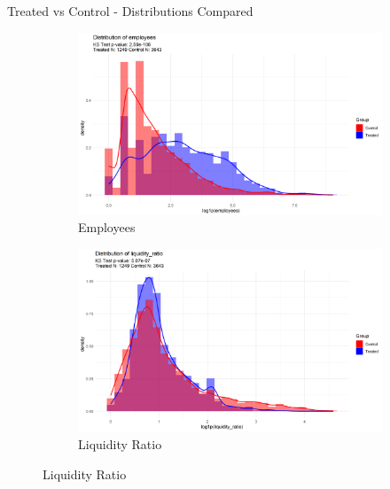 \documentclass{beamer}
\begin{document}
\begin{frame}{Treated vs Control - Distributions Compared}
\begin{figure}[ht]
\begin{subfigure}[b]{0.45\textwidth}
            \end{subfigure}
            \hfill
            \begin{subfigure}[b]{0.45\textwidth}
                \centering
                \includegraphics[width=\linewidth]{../Output/distrib_compare_employees_allcountries.png}
                \caption{Employees}
                \label{fig:employees}
            \end{subfigure}
            \vspace{0.5cm}
            \begin{subfigure}[b]{0.45\textwidth}
                \centering
                \includegraphics[width=\linewidth]{../Output/distrib_compare_liquidity_ratio_allcountries.png}
                \caption{Liquidity Ratio}


\end{subfigure}
\end{figure}
\end{frame}
\end{document}
